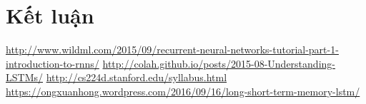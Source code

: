\documentclass[a4paper,12pt]{report}
\begin{document}
\chapter{Kết luận} 


\begin{thebibliography}{9}
 \url{http://www.wildml.com/2015/09/recurrent-neural-networks-tutorial-part-1-introduction-to-rnns/}
 \url{http://colah.github.io/posts/2015-08-Understanding-LSTMs/}
 \url{http://cs224d.stanford.edu/syllabus.html}
 \url{https://ongxuanhong.wordpress.com/2016/09/16/long-short-term-memory-lstm/}
\end{thebibliography}
\end{document}
